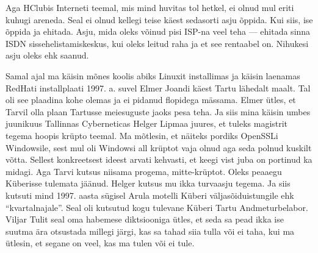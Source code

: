 Aga HClubis Interneti teemal, mis mind huvitas tol hetkel, ei olnud mul eriti
kuhugi areneda. Seal ei olnud kellegi teise käest sedasorti asju õppida. Kui
siis, ise õppida ja ehitada. Asju, mida oleks võinud pisi ISP-na veel teha ---
ehitada sinna ISDN sissehelistamiskeskus, kui oleks leitud raha ja et see
rentaabel on. Nihukesi asju oleks ehk saanud.

Samal ajal ma käisin mõnes koolis abiks Linuxit installimas ja käisin laenamas
RedHati installplaati 1997. a. suvel Elmer Joandi
käest Tartu lähedalt maalt. Tal oli see plaadina kohe olemas ja ei pidanud
flopidega mässama. Elmer ütles, et Tarvil olla plaan
Tartusse meiesuguste jaoks pesa teha. Ja siis mina käisin umbes juunikuus
Tallinnas Cyberneticas Helger Lipmaa  juures, et tuleks magistrit tegema hoopis krüpto teemal. Ma mõtlesin,
et näiteks pordiks OpenSSLi Windowsile, sest
mul oli Windowsi all krüptot vaja olnud aga seda polnud kuskilt võtta. Sellest
konkreetsest ideest arvati kehvasti, et keegi vist juba on portinud ka midagi.
Aga Tarvi kutsus niisama progema, mitte-krüptot. Oleks peaaegu
Küberisse tulemata jäänud. Helger kutsus mu ikka turvaasju tegema. Ja siis
kutsuti mind 1997. aasta sügisel Arula motelli Küberi väljasõiduistungile ehk \enquote{kvartalnajale}. Seal oli kutsutud kogu tulevane
Küberi Tartu Andmeturbelabor. Viljar
Tulit seal oma habemese diktsiooniga ütles, et seda
sa pead ikka ise suutma ära otsustada millegi järgi, kas sa tahad siia tulla
või ei taha, kui ma ütlesin, et segane on veel, kas ma tulen või ei tule.

